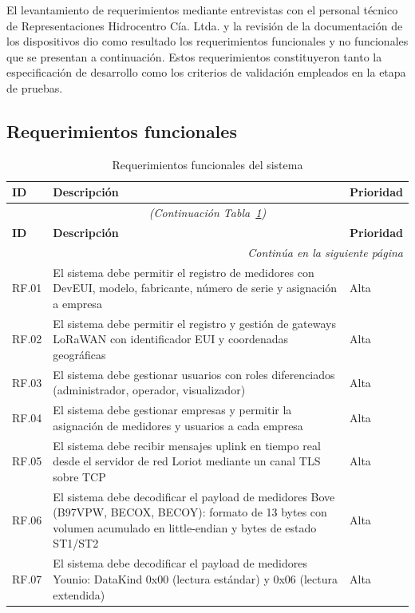 \documentclass[12pt,a4paper,oneside]{report}
\begin{document}
El levantamiento de requerimientos mediante entrevistas con el personal técnico de Representaciones Hidrocentro Cía. Ltda. y la revisión de la documentación de los dispositivos dio como resultado los requerimientos funcionales y no funcionales que se presentan a continuación. Estos requerimientos constituyeron tanto la especificación de desarrollo como los criterios de validación empleados en la etapa de pruebas.

\subsection*{Requerimientos funcionales}

\begin{longtable}{lp{8.5cm}l}
\caption{Requerimientos funcionales del sistema}\label{tab:rf} \\
\toprule
\textbf{ID} & \textbf{Descripción} & \textbf{Prioridad} \\
\midrule
\endfirsthead
\multicolumn{3}{c}{\textit{(Continuación Tabla~\ref{tab:rf})}} \\
\toprule
\textbf{ID} & \textbf{Descripción} & \textbf{Prioridad} \\
\midrule
\endhead
\midrule
\multicolumn{3}{r}{\textit{Continúa en la siguiente página}} \\
\endfoot
\bottomrule
\endlastfoot
RF.01 & El sistema debe permitir el registro de medidores con DevEUI, modelo, fabricante, número de serie y asignación a empresa & Alta \\
RF.02 & El sistema debe permitir el registro y gestión de gateways LoRaWAN con identificador EUI y coordenadas geográficas & Alta \\
RF.03 & El sistema debe gestionar usuarios con roles diferenciados (administrador, operador, visualizador) & Alta \\
RF.04 & El sistema debe gestionar empresas y permitir la asignación de medidores y usuarios a cada empresa & Alta \\
RF.05 & El sistema debe recibir mensajes uplink en tiempo real desde el servidor de red Loriot mediante un canal TLS sobre TCP & Alta \\
RF.06 & El sistema debe decodificar el payload de medidores Bove (B97VPW, BECOX, BECOY): formato de 13 bytes con volumen acumulado en little-endian y bytes de estado ST1/ST2 & Alta \\
RF.07 & El sistema debe decodificar el payload de medidores Younio: DataKind 0x00 (lectura estándar) y 0x06 (lectura extendida) & Alta \\

\end{longtable}
\end{document}

